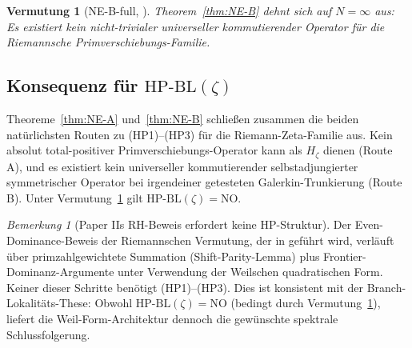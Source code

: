 \documentclass[11pt]{article}
\newtheorem{conjecture}[theorem]{Vermutung}
\theoremstyle{definition}
\theoremstyle{remark}
\newtheorem{remark}[theorem]{Bemerkung}
\newcommand{\HBL}{\mathrm{HP\text{-}BL}}
\begin{document}
\begin{conjecture}[NE-B-full, {\cite[Conj.~\ref{thm:NE-B}-full]{Geiger2026RHII}}]\label{conj:NE-B-full}
Theorem~\ref{thm:NE-B} dehnt sich auf $N = \infty$ aus: Es existiert kein nicht-trivialer
universeller kommutierender Operator für die Riemannsche Primverschiebungs-Familie.
\end{conjecture}

\subsection{Konsequenz für \texorpdfstring{$\HBL(\zeta)$}{HP-BL(zeta)}}

Theoreme~\ref{thm:NE-A} und~\ref{thm:NE-B} schließen zusammen die beiden
natürlichsten Routen zu (HP1)--(HP3) für die Riemann-Zeta-Familie aus.
Kein absolut total-positiver Primverschiebungs-Operator kann als $H_\zeta$ dienen
(Route A), und es existiert kein universeller kommutierender selbstadjungierter
symmetrischer Operator bei irgendeiner getesteten Galerkin-Trunkierung (Route B). Unter
Vermutung~\ref{conj:NE-B-full} gilt $\HBL(\zeta) = \mathrm{NO}$.

\begin{remark}[Paper IIs RH-Beweis erfordert keine HP-Struktur]
\label{rem:riemann-without-hp}
Der Even-Dominance-Beweis der Riemannschen Vermutung, der in \cite{Geiger2026RHII}
geführt wird, verläuft über primzahlgewichtete Summation (Shift-Parity-Lemma)
plus Frontier-Dominanz-Argumente unter Verwendung der Weilschen quadratischen Form.
Keiner dieser Schritte benötigt (HP1)--(HP3). Dies ist konsistent mit der
Branch-Lokalitäts-These: Obwohl $\HBL(\zeta) = \mathrm{NO}$ (bedingt durch
Vermutung~\ref{conj:NE-B-full}), liefert die Weil-Form-Architektur dennoch
die gewünschte spektrale Schlussfolgerung.
\end{remark}
\end{document}
